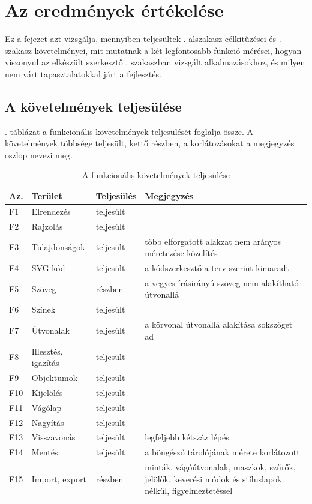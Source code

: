 \chapter{Az eredmények értékelése}
\label{ch:evaluation}

Ez a fejezet azt vizsgálja, mennyiben teljesültek . alszakasz célkitűzései és . szakasz követelményei, mit mutatnak a két legfontosabb funkció mérései, hogyan viszonyul az elkészült szerkesztő . szakaszban vizsgált alkalmazásokhoz, és milyen nem várt tapasztalatokkal járt a fejlesztés.

\section{A követelmények teljesülése}
\label{sec:req_fulfilment}

. táblázat a funkcionális követelmények teljesülését foglalja össze. A követelmények többsége teljesült, kettő részben, a korlátozásokat a megjegyzés oszlop nevezi meg.

\begin{table}[!ht]
\caption{A funkcionális követelmények teljesülése}
\label{tab:fulfilment}
\centering
\footnotesize
\renewcommand{\arraystretch}{1.15}
\begin{tabular}{|l|>{\raggedright\arraybackslash}p{}|l|>{\raggedright\arraybackslash}p{}|}
\hline
\textbf{Az.} & \textbf{Terület} & \textbf{Teljesülés} & \textbf{Megjegyzés} \\ \hline
F1 & Elrendezés & teljesült & \\ \hline
F2 & Rajzolás & teljesült & \\ \hline
F3 & Tulajdonságok & teljesült & több elforgatott alakzat nem arányos méretezése közelítés \\ \hline
F4 & SVG-kód & teljesült & a kódszerkesztő a terv szerint kimaradt \\ \hline
F5 & Szöveg & részben & a vegyes írásirányú szöveg nem alakítható útvonallá \\ \hline
F6 & Színek & teljesült & \\ \hline
F7 & Útvonalak & teljesült & a körvonal útvonallá alakítása sokszöget ad \\ \hline
F8 & Illesztés, igazítás & teljesült & \\ \hline
F9 & Objektumok & teljesült & \\ \hline
F10 & Kijelölés & teljesült & \\ \hline
F11 & Vágólap & teljesült & \\ \hline
F12 & Nagyítás & teljesült & \\ \hline
F13 & Visszavonás & teljesült & legfeljebb kétszáz lépés \\ \hline
F14 & Mentés & teljesült & a böngésző tárolójának mérete korlátozott \\ \hline
F15 & Import, export & részben & minták, vágóútvonalak, maszkok, szűrők, jelölők, keverési módok és stíluslapok nélkül, figyelmeztetéssel \\ \hline
\end{tabular}
\end{table}

